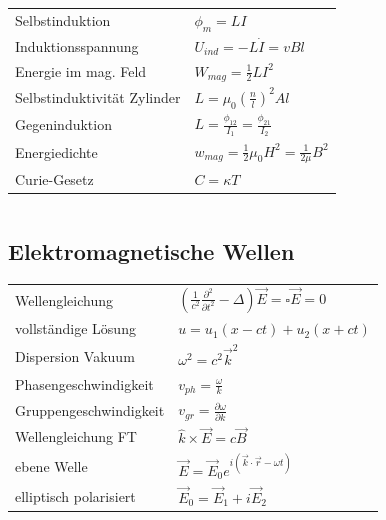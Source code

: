 \documentclass[12pt,a4paper]{article}
\newcommand{\pd}[2]{\frac{\partial #1}{\partial #2}}
\newcommand{\pdd}[2]{\frac{\partial^2 #1}{\partial #2^2}}
\renewcommand{\=}[1]{\stackrel{#1}{=}}
\newcommand{\ort}{\vec r}
\theoremstyle{definition}
\theoremstyle{remark}
\begin{document}
\begin{center}
\begin{minipage}[t]{.5\linewidth}
\vspace{0pt}
\noindent\begin{tabular}{ll}
Selbstinduktion & $\phi_m = L I$\\
Induktionsspannung & $U_{ind} = - L \dot{I} =  v B l$\\
Energie im mag. Feld & $W_{mag} = \frac{1}{2} L I^2$\\
Selbstinduktivität Zylinder & $L = \mu_0 (\frac{n}{l})^2 A l$\\
Gegeninduktion & $L = \frac{\phi_{12}}{I_1} = \frac{\phi_{21}}{I_2}$\\
Energiedichte & $w_{mag} = \frac{1}{2} \mu_0 H^2 = \frac{1}{2 \mu}B^2$\\
Curie-Gesetz & $C = \kappa T$\\
\end{tabular}
\end{minipage}%
\begin{minipage}[t]{.5\linewidth}
\vspace{0pt}
\begin{tabular}{ll}

\end{tabular}
\end{minipage}
\end{center}


\subsection{Elektromagnetische Wellen}

\begin{center}
\begin{minipage}[t]{.5\linewidth}
\vspace{0pt}
\noindent\begin{tabular}{ll}
Wellengleichung & $(\frac{1}{c^2} \pdd{}{t} - \Delta) \vec E = \square \vec E = 0$\\
vollständige Lösung & $u = u_1 (x-ct) + u_2 (x+ct)$\\
Dispersion Vakuum & $\omega^2 = c^2 \vec k^2$\\
Phasengeschwindigkeit & $v_{ph} = \frac{\omega}{k}$\\
Gruppengeschwindigkeit & $v_{gr} = \pd{\omega}{k}$\\
Wellengleichung FT & $\hat k \times \vec E = c \vec B$\\
ebene Welle & $\vec E = \vec E_0 e^{i(\vec k \cdot \ort - \omega t)}$\\
elliptisch polarisiert & $\vec E_0 = \vec E_1 + i \vec E_2$\\
\end{tabular}
\end{minipage}%
\begin{minipage}[t]{.5\linewidth}
\vspace{0pt}
\noindent\begin{tabular}{ll}

\end{tabular}
\end{minipage}
\end{center}
\end{document}
